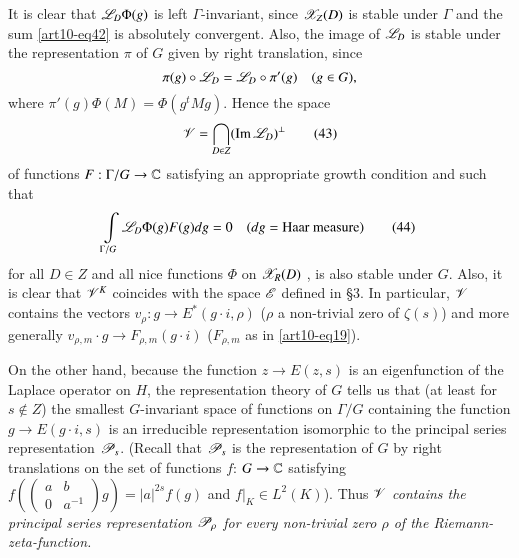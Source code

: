It is clear that $\mathscr{L}_D \Phi (g)$ is left $\Gamma$-invariant, since $\mathscr{X}_Z(D)$ is stable under $\Gamma$ and the sum \eqref{art10-eq42} is absolutely convergent. Also, the image of $\mathscr{L}_D$ is stable under the representation $\pi$ of $G$ given by right translation, since 
$$
\pi (g) \circ \mathscr{L}_D = \mathscr{L}_D \circ \pi'(g) \quad  (g \in G),
$$
where $\pi'(g) \Phi (M)= \Phi (g^t M g)$. Hence the space
\begin{equation*}
\mathscr{V} = \bigcap\limits_{ D \in Z} (\operatorname{Im} \mathscr{L}_D)^\perp \tag{43} \label{art10-eq43}
\end{equation*}
of functions $F: \Gamma / G \to \mathbb{C}$ satisfying an appropriate growth condition and such that 
\begin{equation*}
\int\limits_{\Gamma / G} \mathscr{L}_D \Phi (g) F (g) d g = 0 \quad (dg= \text{Haar measure}) \tag{44}\label{art10-eq44}
\end{equation*}
for all $D \in Z$ and all nice functions $\Phi$ on $\mathscr{X}_R (D)$ , is also stable under $G$.  Also, it is clear that $\mathscr{V}^K$ coincides with the space $\mathscr{E}$ defined in \S 3. In particular, $\mathscr{V}$ contains the vectors $v_\rho: g \to E^\ast (g \cdot i, \rho)$ ($\rho$ a non-trivial zero of $\zeta(s)$) and more generally $v_{\rho, m} \cdot g \to F_{\rho, m} (g \cdot i)$ ($F_{\rho, m}$ as in \eqref{art10-eq19}).

On the other hand, because the function $z \to E (z,s)$ is an eigenfunction of the Laplace operator on $H$, the representation theory of $G$ tells us that (at least for $s \not\in Z$) the smallest $G$-invariant space of functions on $\Gamma / G$ containing the function $g \to E (g \cdot i, s)$ is an irreducible representation isomorphic to the principal series representation $\mathscr{P}_s$. (Recall that $\mathscr{P}_s$ is the representation of $G$ by right translations on the set of functions $f$: $G \to \mathbb{C}$ satisfying $f\left(\left(\begin{matrix}a & b \\ 0 & a^{-1} \end{matrix}\right) g\right) = |a|^{2s} f (g)$ and $f\big|_K \in L^2 (K)$). Thus \textit{$\mathscr{V}$ contains the principal series representation $\mathscr{P}_\rho$ for every non-trivial zero $\rho$ of the Riemann-zeta-function.}

